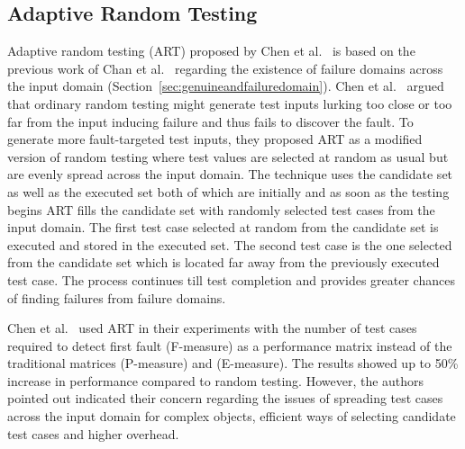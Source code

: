 \subsection{Adaptive Random Testing}
\label{sec:artpatterns_2}
Adaptive random testing (ART) proposed by Chen et al.~\cite{chen2005adaptive} is based on the previous work of Chan et al.~\cite{chan1996proportional} regarding the existence of failure domains across the input domain (Section~\ref{sec:genuineandfailuredomain}). Chen et al.~\cite{chen2005adaptive} argued that ordinary random testing might generate test inputs lurking too close or too far from the input inducing failure and thus fails to discover the fault. To generate more fault-targeted test inputs, they proposed ART as a modified version of random testing where test values are selected at random as usual but are evenly spread across the input domain.  The technique uses the candidate set as well as the executed set both of which are initially and as soon as the testing begins ART fills the candidate set with randomly selected test cases from the input domain. The first test case selected at random from the candidate set is executed and stored in the executed set. The second test case is the one selected from the candidate set which is located far away from the previously executed test case. The process continues till test completion and provides greater chances of finding failures from failure domains.

Chen et al.~\cite{chen2005adaptive} used ART in their experiments with the number of test cases required to detect first fault (F-measure) as a performance matrix instead of the traditional matrices (P-measure) and (E-measure). The results showed up to 50\% increase in performance compared to random testing. However, the authors pointed out indicated their concern regarding the issues of spreading test cases across the input domain for complex objects, efficient ways of selecting candidate test cases and higher overhead. %

